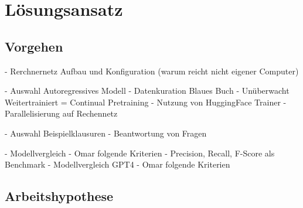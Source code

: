 \chapter{Lösungsansatz}\label{ch:approach}
\section*{Vorgehen}
- Rerchnernetz Aufbau und Konfiguration (warum reicht nicht eigener Computer)

- Auswahl Autoregressives Modell
- Datenkuration Blaues Buch
- Unüberwacht Weitertrainiert = Continual Pretraining
    - Nutzung von HuggingFace Trainer
    - Parallelisierung auf Rechennetz

- Auswahl Beispielklausuren
- Beantwortung von Fragen

- Modellvergleich
    - Omar folgende Kriterien
    - Precision, Recall, F-Score als Benchmark
- Modellvergleich GPT4
    - Omar folgende Kriterien

\section*{Arbeitshypothese}

